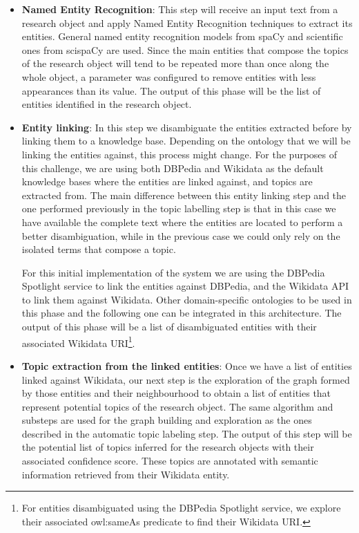 \documentclass[runningheads]{llncs}
\begin{document}
\begin{itemize}
	\item \textbf{Named Entity Recognition}: This step will receive an input text from a research object and apply Named Entity Recognition techniques to extract its entities. General named entity recognition models from spaCy and scientific ones from scispaCy are used. Since the main entities that compose the topics of the research object will tend to be repeated more than once along the whole object, a parameter was configured to remove entities with less appearances than its value. The output of this phase will be the list of entities identified in the research object.
	\item \textbf{Entity linking}: In this step we disambiguate the entities extracted before by linking them to a knowledge base. Depending on the ontology that we will be linking the entities against, this process might change. For the purposes of this challenge, we are using both DBPedia and Wikidata as the default knowledge bases where the entities are linked against, and topics are extracted from. The main difference between this entity linking step and the one performed previously in the topic labelling step is that in this case we have available the complete text where the entities are located to perform a better disambiguation, while in the previous case we could only rely on the isolated terms that compose a topic.
	
	For this initial implementation of the system we are using the DBPedia Spotlight \cite{mendes2011dbpedia} service to link the entities against DBPedia, and the Wikidata API to link them against Wikidata. Other domain-specific ontologies to be used in this phase and the following one can be integrated in this architecture. The output of this phase will be a list of disambiguated entities with their associated Wikidata URI\footnote{For entities disambiguated using the DBPedia Spotlight service, we explore their associated owl:sameAs predicate to find their Wikidata URI.}.
	\item \textbf{Topic extraction from the linked entities}: Once we have a list of entities linked against Wikidata, our next step is the exploration of the graph formed by those entities and their neighbourhood to obtain a list of entities that represent potential topics of the research object. The same algorithm and substeps are used for the graph building and exploration as the ones described in the automatic topic labeling step. The output of this step will be the potential list of topics inferred for the research objects with their associated confidence score. These topics are annotated with semantic information retrieved from their Wikidata entity.
\end{itemize}
\end{document}
